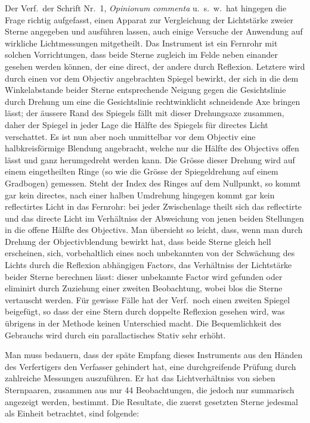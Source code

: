 \documentclass[12pt,a4paper]{article}
\begin{document}
Der Verf.\ der Schrift Nr.\ 1, \textit{Opinionum commenta} u.\ s.\ w.\ hat hingegen die Frage richtig aufgefasst, einen Apparat zur Vergleichung der Lichtst\"arke zweier Sterne angegeben und ausf\"uhren lassen, auch einige Versuche der Anwendung auf wirkliche Lichtmessungen mitgetheilt. Das Instrument ist ein Fernrohr mit solchen Vorrichtungen, dass beide Sterne zugleich im Felde neben einander gesehen werden k\"onnen, der eine direct, der andere durch Reflexion. Letztere wird durch einen vor dem Objectiv angebrachten Spiegel bewirkt, der sich in die dem Winkelabstande beider Sterne entsprechende Neigung gegen die Gesichtslinie durch Drehung um eine die Gesichtslinie rechtwinklicht schneidende Axe bringen l\"asst; der \"aussere Rand des Spiegels f\"allt mit dieser Drehungsaxe zusammen, daher der Spiegel in jeder Lage die H\"alfte des Spiegels f\"ur directes Licht verschattet. Es ist nun aber noch unmittelbar vor dem Objectiv eine halbkreisf\"ormige Blendung angebracht, welche nur die H\"alfte des Objectivs offen l\"asst und ganz herumgedreht werden kann. Die Gr\"osse dieser Drehung wird auf einem eingetheilten Ringe (so wie die Gr\"osse der Spiegeldrehung auf einem Gradbogen) gemessen. Steht der Index des Ringes auf dem Nullpunkt, so kommt gar kein directes, nach einer halben Umdrehung hingegen kommt gar kein reflectirtes Licht in das Fernrohr: bei jeder Zwischenlage theilt sich das reflectirte und das directe Licht im Verh\"altniss der Abweichung von jenen beiden Stellungen in die offene H\"alfte des Objectivs. Man \"ubersieht so leicht, dass, wenn man durch Drehung der Objectivblendung bewirkt hat, dass beide Sterne gleich hell erscheinen, sich, vorbehaltlich eines noch unbekannten von der Schw\"achung des Lichts durch die Reflexion abh\"angigen Factors, das Verh\"altniss der Lichtst\"arke beider Sterne berechnen l\"asst: dieser unbekannte Factor wird gefunden oder eliminirt durch Zuziehung einer zweiten Beobachtung, wobei blos die Sterne vertauscht werden. F\"ur gewisse F\"alle hat der Verf.\ noch einen zweiten Spiegel beigef\"ugt, so dass der eine Stern durch doppelte Reflexion gesehen wird, was \"ubrigens in der Methode keinen Unterschied macht. Die Bequemlichkeit des Gebrauchs wird durch ein parallactisches Stativ sehr erh\"oht.

Man muss bedauern, dass der sp\"ate Empfang dieses Instruments aus den H\"anden des Verfertigers den Verfasser gehindert hat, eine durchgreifende Pr\"ufung durch zahlreiche Messungen auszuf\"uhren. Er hat das Lichtverh\"altniss von sieben Sternpaaren, zusammen aus nur 44 Beobachtungen, die jedoch nur summarisch angezeigt werden, bestimmt. Die Resultate, die zuerst gesetzten Sterne jedesmal als Einheit betrachtet, sind folgende:
\end{document}
